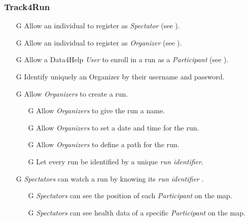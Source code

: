 \documentclass[../../rasd.tex]{subfiles}
\begin{document}
				\subsubsection{Track4Run}
					\begin{itemize}
						\item[G\subs{15}]Allow an individual to register as \textit{Spectator} (see ).
						\item[G\subs{16}]Allow an individual to register as \textit{Organizer} (see ).
						\item[G\subs{17}]Allow a Data4Help \textit{User} to enroll in a run as a \textit{Participant} (see ).
						\item[G\subs{18}]Identify uniquely an Organizer by their username and password.
						
						\item[G\subs{20}]Allow \textit{Organizers} to create a run.
						\begin{itemize}
							\item[G\subs{20.1}]Allow \textit{Organizers} to give the run a name.
							\item[G\subs{20.2}]Allow \textit{Organizers} to set a date and time for the run.
							\item[G\subs{20.3}]Allow \textit{Organizers} to define a path for the run.
							\item[G\subs{20.4}]Let every run be identified by a unique \textit{run identifier}.
						\end{itemize}

						\item[G\subs{21}]\textit{Spectators} can watch a run by knowing its \textit{run identifier} .
							\begin{itemize}
							\item[G\subs{21.1}]\textit{Spectators} can see the position of each \textit{Participant} on the map.
							\item[G\subs{21.2}]\textit{Spectators} can see health data of a specific \textit{Participant} on the map.
							\end{itemize}
					\end{itemize}
\end{document}
